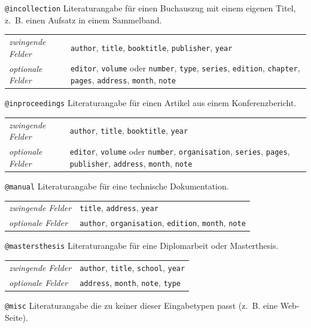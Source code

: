 \documentclass[a4paper,10pt,twoside]{scrbook}
\begin{document}
\verb!@incollection! Literaturangabe für einen 
Buchauszug mit einem eigenen Titel, z.~B. einen Aufsatz in einem Sammelband.

\begin{tabular}{p{2.8cm}p{10cm}}
	 \textsl{zwingende Felder} & \texttt{author}, \texttt{title}, \texttt{booktitle}, \texttt{publisher}, \texttt{year}\\
	 \textsl{optionale Felder} & \texttt{editor}, \texttt{volume} oder \texttt{number}, \texttt{type}, \texttt{series}, \texttt{edition}, \texttt{chapter}, \texttt{pages}, \texttt{address}, \texttt{month}, \texttt{note}\\
\end{tabular}

\verb!@inproceedings! Literaturangabe für einen 
Artikel aus einem Konferenzbericht.

\begin{tabular}{p{2.8cm}p{10cm}}
	 \textsl{zwingende Felder} & \texttt{author}, \texttt{title}, \texttt{booktitle}, \texttt{year}\\
	 \textsl{optionale Felder} & \texttt{editor}, \texttt{volume} oder \texttt{number}, \texttt{organisation}, \texttt{series}, \texttt{pages}, \texttt{publisher}, \texttt{address}, \texttt{month}, \texttt{note}\\
\end{tabular}

\verb!@manual! Literaturangabe für eine technische Dokumentation.

\begin{tabular}{p{2.8cm}p{10cm}}
	 \textsl{zwingende Felder} & \texttt{title}, \texttt{address}, \texttt{year} \\
	 \textsl{optionale Felder} & \texttt{author}, \texttt{organisation}, \texttt{edition}, \texttt{month}, \texttt{note}\\
\end{tabular}

\verb!@mastersthesis! Literaturangabe für eine Diplomarbeit oder Masterthesis.

\begin{tabular}{p{2.8cm}p{10cm}}
	 \textsl{zwingende Felder} & \texttt{author}, \texttt{title}, \texttt{school}, \texttt{year}\\
	 \textsl{optionale Felder} & \texttt{address}, \texttt{month}, \texttt{note}, \texttt{type}\\
\end{tabular}

\verb!@misc! Literaturangabe die zu keiner dieser Eingabetypen passt (z.~B. eine Web-Seite).
\end{document}
